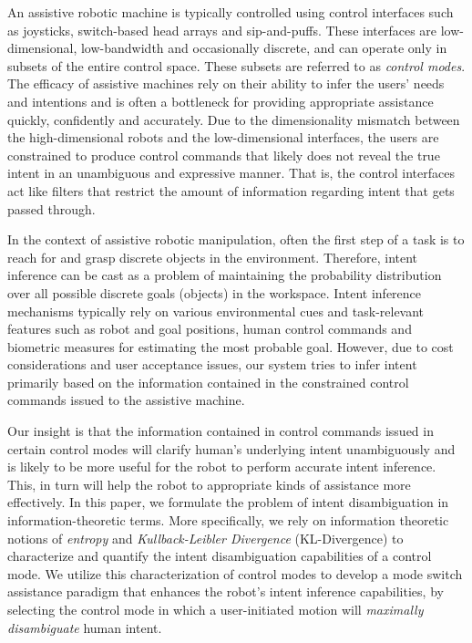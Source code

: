 \documentclass[conference]{IEEEtran}
\begin{document}
An assistive robotic machine is typically controlled using control interfaces such as joysticks, switch-based head arrays and sip-and-puffs. These interfaces are low-dimensional, low-bandwidth and occasionally discrete, and can operate only in subsets of the entire control space. These subsets are referred to as \textit{control modes}. The efficacy of assistive machines rely on their ability to infer the users' needs and intentions and is often a bottleneck for providing appropriate assistance quickly, confidently and accurately. Due to the dimensionality mismatch between the high-dimensional robots and the low-dimensional interfaces, the users are constrained to produce control commands that likely does not reveal the true intent in an unambiguous and expressive manner. That is, the control interfaces act like filters that restrict the amount of information regarding intent that gets passed through. 

In the context of assistive robotic manipulation, often the first step of a task is to reach for and grasp discrete objects in the environment. Therefore, intent inference can be cast as a problem of maintaining the probability distribution over all possible discrete goals (objects) in the workspace. Intent inference mechanisms typically rely on various environmental cues and task-relevant features such as robot and goal positions, human control commands and biometric measures for estimating the most probable goal. However, due to cost considerations and user acceptance issues, our system tries to infer intent primarily based on the information contained in the constrained control commands issued to the assistive machine.

Our insight is that the information contained in control commands issued in certain control modes will clarify human's underlying intent unambiguously and is likely to be more useful for the robot to perform accurate intent inference. This, in turn will help the robot to appropriate kinds of assistance more effectively. In this paper, we formulate the problem of intent disambiguation in information-theoretic terms. More specifically, we rely on information theoretic notions of \textit{entropy} and \textit{Kullback-Leibler Divergence} (KL-Divergence) to characterize and quantify the intent disambiguation capabilities of a control mode. We utilize this characterization of control modes to develop a mode switch assistance paradigm that enhances the robot's intent inference capabilities, by selecting the control mode in which a user-initiated motion will \textit{maximally disambiguate} human intent. 
\end{document}
